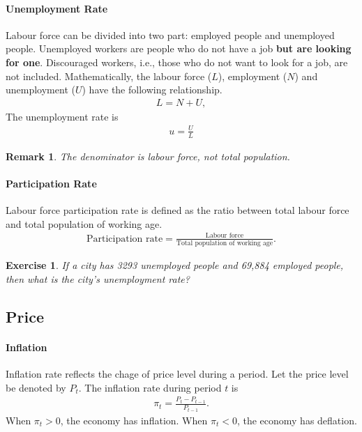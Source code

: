 \documentclass[12pt]{article}
\newtheorem*{remark}{Remark}
\newtheorem{exercise}{Exercise}
\numberwithin{equation}{section}
\begin{document}
\paragraph{Unemployment Rate}
Labour force can be divided into two part: employed people and unemployed people. Unemployed workers are people who do not have a job \textbf{but are looking for one}. Discouraged workers, i.e., those who do not want to look for a job, are not included. Mathematically, the labour force ($L$), employment ($N$) and unemployment ($U$) have the following relationship.
\begin{align*}
    L = N + U,
\end{align*}
The unemployment rate is
\begin{align*}
    u=\frac{U}{L}
\end{align*}
\begin{remark}
    The denominator is labour force, not total population.
\end{remark}

\paragraph{Participation Rate}
Labour force participation rate is defined as the ratio between total labour force and total population of working age.
\begin{align*}
    \text{Participation rate} = \frac{\text{Labour force}}{\text{Total population of working age}}.
\end{align*}

\begin{exercise}
    If a city has 3293 unemployed people and 69,884 employed people, then what is the city's unemployment rate?
\end{exercise}

\subsection*{Price}
\paragraph{Inflation}
Inflation rate reflects the chage of price level during a period. Let the price level be denoted by $P_t$. The inflation rate during period $t$ is
\begin{align*}
    \pi_t=\frac{P_t-P_{t-1}}{P_{t-1}}.
\end{align*}
When $\pi_t>0$, the economy has inflation. When $\pi_t<0$, the economy has deflation.
\end{document}
